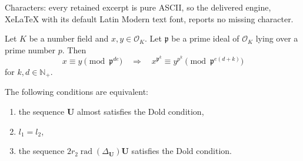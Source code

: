 \documentclass[10pt,a4paper]{amsart}
\DeclareMathOperator{\rad}{rad}
\newcommand{\N}{\mathbb{N}}
\newcommand{\OO}{\mathcal{O}}
\newcommand{\pp}{\mathfrak{p} }
\begin{document}
Characters: every retained excerpt is pure ASCII, so the delivered engine, XeLaTeX with its default Latin Modern text font, reports no missing character.
\begin{lemma}\label{lem_allInOne}
    Let $K$ be a number field and $x,y\in\OO_K$. Let $\pp$ be a prime ideal of $\OO_K$ lying over a prime number $p$. Then 
    $$ x \equiv y \pmod{\pp^{de}} \quad\Rightarrow\quad x^{\pp^k} \equiv y^{p^k} \pmod{\pp^{e(d+k)}}$$
    for $k, d\in \N_+$.
\end{lemma}

\begin{theorem}\label{TheoremNotSquare}
    The following conditions are equivalent:
    \begin{enumerate}
        \itemsep-0.2em
        \item the sequence ${\mathbf U}$ almost satisfies the Dold condition, 
        \item $l_1=l_2$, 
        \item the sequence $2r_2\rad(\Delta_\mathbf{U}){\mathbf U}$ satisfies the Dold condition. 
    \end{enumerate}
\end{theorem}
\end{document}
